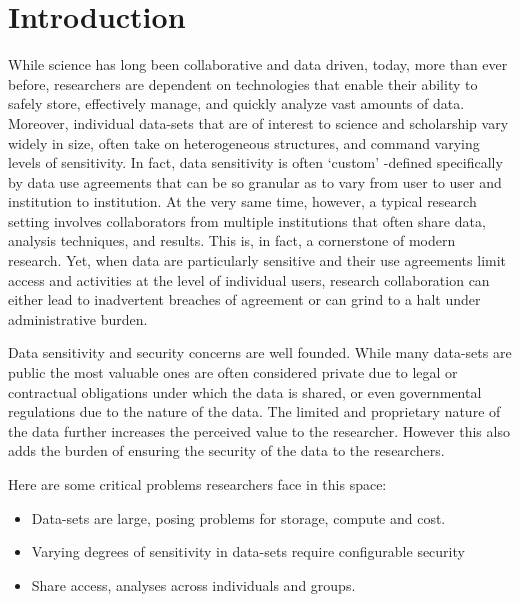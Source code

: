 \section{Introduction}



While science has long been collaborative and data driven, today, more than ever before, researchers are dependent on technologies that enable their ability to safely store, effectively manage, and quickly analyze vast amounts of
data. Moreover, individual data-sets that are of interest to science and scholarship vary widely in size, often take on heterogeneous structures, and command varying levels of sensitivity. In fact, data sensitivity is often `custom' -defined specifically by
data use agreements that can be so granular as to vary from user to user and institution to institution. At the very same time, however, a typical research setting involves collaborators from multiple institutions that often share data, analysis techniques, and results. This is, in fact, a cornerstone of modern research. Yet, when data are particularly sensitive and their use agreements limit access and activities at the level of individual users, research collaboration can either lead to inadvertent breaches of agreement or can grind to a halt under administrative burden.



Data sensitivity and security concerns are well founded. While many data-sets are public the most
valuable ones are often considered private due to legal or contractual obligations under which the data
is shared, or even governmental regulations due to the nature of the data. The limited and proprietary nature
of the data further increases the perceived value to the researcher. However this also adds the burden of
ensuring the security of the data to the researchers.


Here are some critical problems researchers face in this space:

\begin{itemize}
\item Data-sets are large, posing problems for storage, compute and cost.
\item Varying degrees of sensitivity in data-sets require configurable security
\item Share access, analyses across individuals and groups.
\end{itemize}





